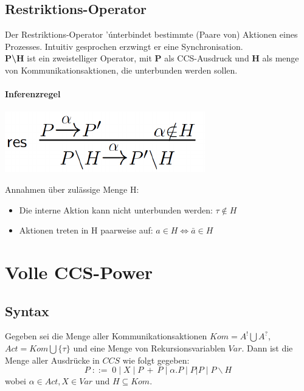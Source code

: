 \documentclass[a4paper,10pt, oneside]{book}
\begin{document}
\subsection{Restriktions-Operator}
Der Restriktions-Operator '\' unterbindet bestimmte (Paare von) Aktionen eines Prozesses. Intuitiv gesprochen erzwingt er eine Synchronisation.\\
\textbf{P\textbackslash H} ist ein zweistelliger Operator, mit \textbf{P} als CCS-Ausdruck und \textbf{H} als menge von Kommunikationsaktionen, die unterbunden werden sollen.

\paragraph{Inferenzregel}
\begin{center}
 \includegraphics[scale=0.6]{res_regel}
\end{center}

Annahmen über zulässige Menge H:
\begin{itemize}
 \item Die interne Aktion kann nicht unterbunden werden: $\tau \notin H$
 \item Aktionen treten in H paarweise auf: $a \in H \Longleftrightarrow \bar{a} \in H$
\end{itemize}

\section{Volle CCS-Power}
\subsection{Syntax}
Gegeben sei die Menge aller Kommunikationsaktionen $Kom = A^! \bigcup A^?$, $Act = Kom \bigcup \{ \tau \}$ und eine Menge von Rekursionsvariablen $Var$. Dann ist die Menge aller Ausdrücke in $CCS$ wie folgt gegeben: \\
\begin{equation*}
 P \; ::= \; 0 \; | \; X \; | \; P \: + \: P \; | \; \alpha.P \; | \; P|P \; | \; P\backslash H
\end{equation*}
wobei $\alpha \in Act, X \in Var$ und $H \subseteq Kom$.
\end{document}
